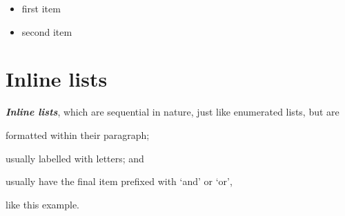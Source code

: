 \documentclass[a4paper,12pt]{article}
\begin{document}
	\begin{itemize}
	\setlength{\itemsep}{1pt}
	\setlength{\parskip}{0pt}
	\setlength{\parsep}{0pt}
		\item first item
		\item second item
	\end{itemize}

	\section*{Inline lists}
	\textbf{\itshape Inline lists}, which are
	sequential in nature, just like enumerated
	lists, but are
	\begin{inparaenum}
		\item formatted within their paragraph;
		\item usually labelled with letters; and 
		\item usually have the final item prefixed with
		`and' or `or',
	\end{inparaenum} like this example.
\end{document}
